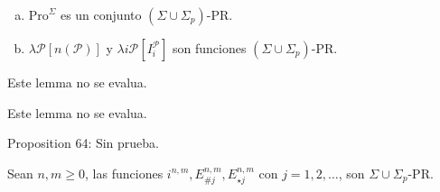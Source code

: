   \begin{lemma}
    \begin{enumerate}[a)]
      \item $\mathrm{Pro}^{\Sigma}$ es un conjunto $(\Sigma \cup \Sigma_{p})$-PR.
      \item $\lambda \mathcal{P} \left[n(\mathcal{P})\right]$ y $\lambda i\mathcal{P} \left[I_{i}^{\mathcal{P}}\right]$
        son funciones $(\Sigma \cup \Sigma_{p})$-PR.
    \end{enumerate}
  \end{lemma}

  \begin{lemma}
    \PN Este lemma no se evalua.
  \end{lemma}

  \begin{lemma}
    \PN Este lemma no se evalua.
  \end{lemma}

  Proposition 64: Sin prueba.
  \begin{proposition}
    \PN Sean $n, m \geq 0$, las funciones $i^{n,m}, E_{\#j}^{n,m}, E_{\star j}^{n,m}$ con $j = 1,2,\dotsc$, son $\Sigma
    \cup \Sigma_{p}$-PR.
  \end{proposition}

